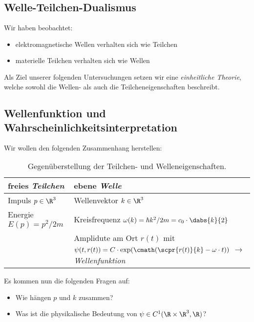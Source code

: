 \documentclass{article}
\begin{document}
    \subsection*{Welle-Teilchen-Dualismus}
        Wir haben beobachtet:
        \begin{itemize}[label=$\to$]
            \item elektromagnetische Wellen verhalten sich wie Teilchen
            \item materielle Teilchen verhalten sich wie Wellen
        \end{itemize}
        Als Ziel unserer folgenden Untersuchungen setzen wir eine \emph{einheitliche Theorie}, welche sowohl die Wellen- als auch die Teilcheneigenschaften beschreibt. 

    \subsection*{Wellenfunktion und Wahrscheinlichkeitsinterpretation}
        Wir wollen den folgenden Zusammenhang herstellen:
        \begin{table}[H]
            \centering
            \begin{tabular}{p{5cm}|p{6cm}}
                freies \emph{Teilchen} & ebene \emph{Welle} \\
                \hline
                Impuls $p\in\R^3$ & Wellenvektor $k\in\R^3$ \\
                Energie $E(p) = p^2/2m$ & Kreisfrequenz $\omega(k) = \hbar k^2/2m = c_0\cdot\dabs{k}{2}$ \\
                 & Amplidute am Ort $r(t)$ mit $\psi(t,r(t)) = C\cdot\exp(\cmath(\scpr{r(t)}{k} - \omega\cdot t))$ $\to$ \emph{Wellenfunktion}
            \end{tabular}
            \caption{Gegenüberstellung der Teilchen- und Welleneigenschaften.}
        \end{table}
        \noindent Es kommen nun die folgenden Fragen auf:
        \begin{itemize}[label=$\to$]
            \item Wie hängen $p$ und $k$ zusammen? 
            \item Was ist die physikalische Bedeutung von $\psi\in C^1(\R\times\R^3,\R)$?
        \end{itemize}
\end{document}
